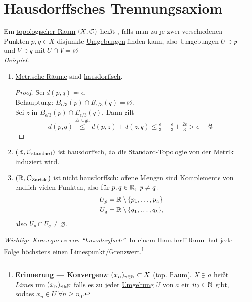 \section{Hausdorffsches Trennungsaxiom}
\begin{remark}
  \label{def:hausdorffsch}
  Ein \hyperref[def:topologie]{topologischer Raum} $ (X,\mathcal{O}) $ heißt , falls man zu je zwei verschiedenen Punkten $ p,q \in X $ disjunkte \hyperref[def:umgebung]{Umgebungen} finden kann, also Umgebungen $ U \ni p $ und $ V \ni q $ mit $ U \cap V = \varnothing $. \\
  \emph{Beispiel}:
  \begin{enumerate}
    \item \hyperref[def:metrischerRaum]{Metrische Räume} sind \hyperref[def:hausdorffsch]{hausdorffsch}.
    \begin{proof}
       Sei $ d(p,q) \eqqcolon \epsilon $. \\
       Behauptung: $ B_{\epsilon/3}(p) \cap B_{\epsilon/3}(q) = \varnothing $. \\
       Sei $ z $ in $ B_{\epsilon/3}(p) \cap B_{\epsilon/3}(q) $. Dann gilt
       \begin{equation*}
         d(p,q) \overset{\triangle\text{-Ugl.}}{\leq} d(p,z)+d(z,q) \leq \tfrac{\epsilon}{3} + \tfrac{\epsilon}{3} + \tfrac{2\epsilon}{3} > \epsilon \quad \lightning
       \end{equation*}
     \end{proof} 
    \item $ (\mathbb{R}, \mathcal{O}_\text{standard}) $ ist hausdorffsch, da die \hyperref[bsp:standardtopologie]{Standard-Topologie} von der \hyperref[def:metrik]{Metrik} induziert wird.
    \item \hyperref[bsp:zariskitopologie]{$ (\mathbb{R}, \mathcal{O}_\text{Zariski}) $} ist \underline{nicht} hausdorffsch: offene Mengen sind Komplemente von endlich vielen Punkten, also für $ p, q \in \mathbb{R}, \ p \neq q $:
    \begin{align*}
      U_p &= \mathbb{R} \setminus \{ p_1, \dots, p_n \} \\
      U_q &= \mathbb{R} \setminus \{ q_1, \dots, q_k \}\text{,}
    \end{align*}
    also $ U_p \cap U_q \neq \varnothing $.
  \end{enumerate}
  \emph{Wichtige Konsequenz von ``hausdorffsch''}: In einem Hausdorff-Raum hat jede Folge höchstens einen Limespunkt/Grenzwert.\footnote{\textbf{Erinnerung --- Konvergenz}: $ (x_n)_{n \in \mathbb{N}} \subset X $ (\hyperref[def:topologie]{top. Raum}). $ X \ni a $ heißt \emph{Limes} um $ (x_n)_{n \in \mathbb{N}} $ falls es zu jeder \hyperref[def:umgebung]{Umgebung} $ U $ von $ a $ ein $ n_0 \in \mathbb{N} $ gibt, sodass $ x_n \in U \ \forall n \geq n_0 $.}
\end{remark}

